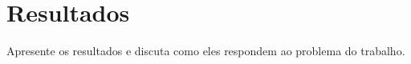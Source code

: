 \section{Resultados}

Apresente os resultados e discuta como eles respondem ao problema do trabalho.
